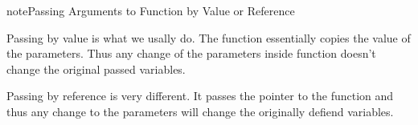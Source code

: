 \documentclass[letterpaper,12pt,english]{sphinxmanual}
\begin{document}
\begin{sphinxadmonition}{note}{Passing Arguments to Function by Value or Reference}

Passing by value is what we usally do. The function essentially copies the value of the parameters. Thus any change of the parameters inside function doesn't change the original passed variables.

Passing by reference is very different. It passes the pointer to the function and thus any change to the parameters will change the originally defiend variables.

\begin{sphinxVerbatim}[commandchars=\\\{\}]
 
  

   
      

  

      

         

         

         

    
\end{sphinxVerbatim}
\end{sphinxadmonition}
\end{document}
